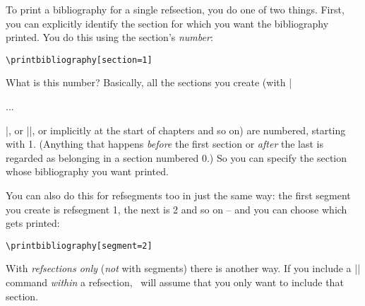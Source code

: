 To print a bibliography for a single refsection, you do one of two
things. First, you can explicitly identify the section for which you
want the bibliography printed. You do this using the section's
\emph{number}:

\begin{Verbatim}
\printbibliography[section=1]
\end{Verbatim}

What is this number? Basically, all the sections you create (with
|\begin{refsection}...\end{refsection}|, or |\newrefsection|, or
implicitly at the start of chapters and so on) are numbered, starting
with 1. (Anything that happens \emph{before} the first section or
\emph{after} the last is regarded as belonging in a section numbered
0.) So you can specify the section whose bibliography you want
printed.

You can also do this for refsegments too in just the same way: the
first segment you create is refsegment 1, the next is 2 and so on --
and you can choose which gets printed:

\begin{Verbatim}
\printbibliography[segment=2]
\end{Verbatim}

With \emph{refsections only} (\emph{not} with segments) there is
another way. If you include a |\printbibliography| command
\emph{within} a refsection, \biblatex\ will assume that you only want
to include that section.

